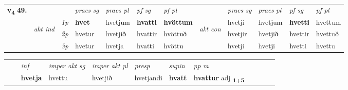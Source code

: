 \begin{tabular}{llllllllllll} \toprule
\multirow{4}{*}{{{\textbf{v{\textsubscript{4}}} \Large{\textbf{49.}}}}}  & &   &  \textit{praes sg}  & \textit{praes pl}  &\textit{ pf sg} & \textit{pf pl} &  &  \textit{praes sg}  & \textit{praes pl}  & \textit{pf sg} & \textit{pf pl } \\*
	\cmidrule{4-7} \cmidrule{9-12}
 & \multirow{3}{*}{\begin{turn}{90}\textit{akt ind}\end{turn}} & {\textit{1p}} & \textbf{hvet} & hvetjum    & \textbf{hvatti} & \textbf{hvöttum} & \multirow{3}{*}{\begin{turn}{90}\textit{akt con}\end{turn}} &hvetji & hvetjum & \textbf{hvetti} & hvettum\\*
& &  {\textit{2p}} &  hvetur  & hvetjið   & hvattir & hvöttuð & & hvetjir & hvetjið & hvettir & hvettuð \\*
& &  {\textit{3p}} & hvetur & hvetja   & hvatti & hvöttu & & hvetji & hvetji& hvetti & hvettu  \\*
\cmidrule{4-7} \cmidrule{9-12}
\end{tabular}


\begin{tabular}{llllllllllll}
 & & \textit{inf} & \textit{imper akt sg} & \textit{imper akt pl}   & \textit{presp} & \textit{supin}  & \textit{pp m}     \\*
  & & \textbf{hvetja} & hvettu  & hvetjið   & hvetjandi &  \textbf{hvatt}  & \textbf{hvattur} adj \textbf{\textsubscript{1+5}} \\*
\cmidrule{1-12}
\end{tabular}



